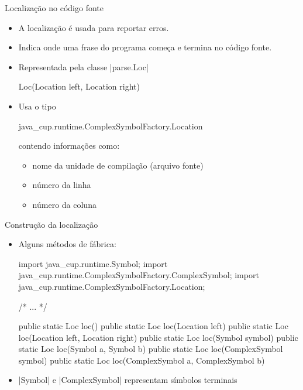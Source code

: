 \begin{frame}{Localização no código fonte}
  \begin{itemize}
    \item A localização é usada para reportar erros.
    \item Indica onde uma frase do programa começa e termina no código
    fonte.
    \item Representada pela classe \pyginline|parse.Loc|
    \begin{pygmented}[lang=java]
Loc(Location left, Location right)
    \end{pygmented}
    \item Usa o tipo
    \begin{pygmented}[lang=java]
java_cup.runtime.ComplexSymbolFactory.Location
    \end{pygmented}
    contendo informações como:
    \begin{itemize}
      \item nome da unidade de compilação (arquivo fonte)
      \item número da linha
      \item número da coluna
    \end{itemize}
  \end{itemize}
\end{frame}

\begin{frame}{Construção da localização}
  \begin{itemize}
    \item Alguns métodos de fábrica:
\begin{pygmented}[]
import java_cup.runtime.Symbol;
import java_cup.runtime.ComplexSymbolFactory.ComplexSymbol;
import java_cup.runtime.ComplexSymbolFactory.Location;

/* ... */

public static Loc loc()
public static Loc loc(Location left)
public static Loc loc(Location left, Location right)
public static Loc loc(Symbol symbol)
public static Loc loc(Symbol a, Symbol b)
public static Loc loc(ComplexSymbol symbol)
public static Loc loc(ComplexSymbol a, ComplexSymbol b)
\end{pygmented}
    
    \item \pyginline|Symbol| e \pyginline|ComplexSymbol| representam
    símbolos terminais
  \end{itemize}
\end{frame}


